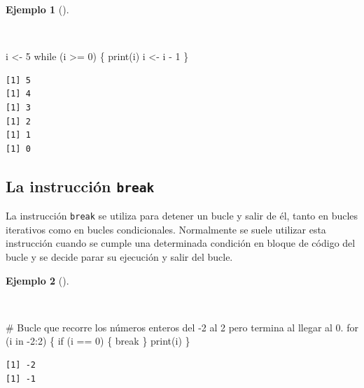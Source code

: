 \documentclass[
  a4paper,
]{scrreport}
\newenvironment{Shaded}{\begin{snugshade}}{\end{snugshade}}
\newcommand{\CommentTok}[1]{\textcolor[rgb]{0.37,0.37,0.37}{#1}}
\newcommand{\ControlFlowTok}[1]{\textcolor[rgb]{0.00,0.23,0.31}{#1}}
\newcommand{\DecValTok}[1]{\textcolor[rgb]{0.68,0.00,0.00}{#1}}
\newcommand{\FunctionTok}[1]{\textcolor[rgb]{0.28,0.35,0.67}{#1}}
\newcommand{\NormalTok}[1]{\textcolor[rgb]{0.00,0.23,0.31}{#1}}
\newcommand{\OtherTok}[1]{\textcolor[rgb]{0.00,0.23,0.31}{#1}}
\newcommand{\SpecialCharTok}[1]{\textcolor[rgb]{0.37,0.37,0.37}{#1}}
\theoremstyle{definition}
\theoremstyle{definition}
\newtheorem{example}{Ejemplo}[chapter]
\theoremstyle{remark}
\begin{document}
\begin{example}[]\protect\hypertarget{exm-bucle-condicional}{}\label{exm-bucle-condicional}

~

\begin{Shaded}
\begin{Highlighting}[]
\NormalTok{i }\OtherTok{\textless{}{-}} \DecValTok{5}
\ControlFlowTok{while}\NormalTok{ (i }\SpecialCharTok{\textgreater{}=} \DecValTok{0}\NormalTok{) \{}
  \FunctionTok{print}\NormalTok{(i)}
\NormalTok{  i }\OtherTok{\textless{}{-}}\NormalTok{ i }\SpecialCharTok{{-}} \DecValTok{1}
\NormalTok{\}}
\end{Highlighting}
\end{Shaded}

\begin{verbatim}
[1] 5
[1] 4
[1] 3
[1] 2
[1] 1
[1] 0
\end{verbatim}

\end{example}

\hypertarget{la-instrucciuxf3n-break}{%
\subsection{\texorpdfstring{La instrucción
\texttt{break}}{La instrucción break}}\label{la-instrucciuxf3n-break}}

La instrucción \texttt{break} se utiliza para detener un bucle y salir
de él, tanto en bucles iterativos como en bucles condicionales.
Normalmente se suele utilizar esta instrucción cuando se cumple una
determinada condición en bloque de código del bucle y se decide parar su
ejecución y salir del bucle.

\begin{example}[]\protect\hypertarget{exm-salida-bucle-break}{}\label{exm-salida-bucle-break}

~

\begin{Shaded}
\begin{Highlighting}[]
\CommentTok{\# Bucle que recorre los números enteros del {-}2 al 2 pero termina al llegar al 0.}
\ControlFlowTok{for}\NormalTok{ (i }\ControlFlowTok{in} \SpecialCharTok{{-}}\DecValTok{2}\SpecialCharTok{:}\DecValTok{2}\NormalTok{) \{}
  \ControlFlowTok{if}\NormalTok{ (i }\SpecialCharTok{==} \DecValTok{0}\NormalTok{) \{}
    \ControlFlowTok{break}
\NormalTok{  \} }
  \FunctionTok{print}\NormalTok{(i)}
\NormalTok{\}}
\end{Highlighting}
\end{Shaded}

\begin{verbatim}
[1] -2
[1] -1
\end{verbatim}

\end{example}
\end{document}
